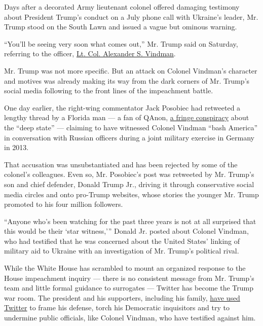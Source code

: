 Days after a decorated Army lieutenant colonel offered damaging
testimony about President Trump's conduct on a July phone call with
Ukraine's leader, Mr. Trump stood on the South Lawn and issued a vague
but ominous warning.

``You'll be seeing very soon what comes out,'' Mr. Trump said on
Saturday, referring to the officer,
\href{https://www.nytimes.com/2019/10/29/us/politics/who-is-alexander-vindman.html}{Lt.
Col. Alexander S. Vindman}.

Mr. Trump was not more specific. But an attack on Colonel Vindman's
character and motives was already making its way from the dark corners
of Mr. Trump's social media following to the front lines of the
impeachment battle.

One day earlier, the right-wing commentator Jack Posobiec had retweeted
a lengthy thread by a Florida man --- a fan of QAnon,
\href{https://www.nytimes.com/interactive/2019/11/02/us/politics/trump-twitter-disinformation.html}{a
fringe conspiracy} about the ``deep state'' --- claiming to have
witnessed Colonel Vindman ``bash America'' in conversation with Russian
officers during a joint military exercise in Germany in 2013.

That accusation was unsubstantiated and has been rejected by some of the
colonel's colleagues. Even so, Mr. Posobiec's post was retweeted by Mr.
Trump's son and chief defender, Donald Trump Jr., driving it through
conservative social media circles and onto pro-Trump websites, whose
stories the younger Mr. Trump promoted to his four million followers.

``Anyone who's been watching for the past three years is not at all
surprised that this would be their `star witness,''' Donald Jr. posted
about Colonel Vindman, who had testified that he was concerned about the
United States' linking of military aid to Ukraine with an investigation
of Mr. Trump's political rival.

While the White House has scrambled to mount an organized response to
the House impeachment inquiry --- there is no consistent message from
Mr. Trump's team and little formal guidance to surrogates --- Twitter
has become the Trump war room. The president and his supporters,
including his family,
\href{https://www.nytimes.com/interactive/2019/11/02/us/politics/trump-twitter-presidency.html}{have
used Twitter} to frame his defense, torch his Democratic inquisitors and
try to undermine public officials, like Colonel Vindman, who have
testified against him.

